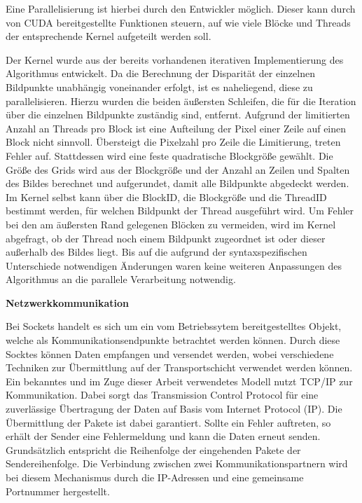 \documentclass[times, 10pt,twocolumn]{article}
\begin{document}
Eine Parallelisierung ist hierbei durch den Entwickler möglich. Dieser kann durch von CUDA bereitgestellte Funktionen steuern, auf wie viele Blöcke und Threads der entsprechende Kernel aufgeteilt werden soll.

Der Kernel wurde aus der bereits vorhandenen iterativen Implementierung des Algorithmus entwickelt. Da die Berechnung der Disparität der einzelnen Bildpunkte unabhängig voneinander erfolgt, ist es naheliegend, diese zu parallelisieren. Hierzu wurden die beiden äußersten Schleifen, die für die Iteration über die einzelnen Bildpunkte zuständig sind, entfernt.  
Aufgrund der limitierten Anzahl an Threads pro Block ist eine Aufteilung der Pixel einer Zeile auf einen Block nicht sinnvoll. Übersteigt die Pixelzahl pro Zeile die Limitierung, treten Fehler auf. Stattdessen wird eine feste quadratische Blockgröße gewählt. Die Größe des Grids wird aus der Blockgröße und der Anzahl an Zeilen und Spalten des Bildes berechnet und aufgerundet, damit alle Bildpunkte abgedeckt werden. Im Kernel selbst kann über die BlockID, die Blockgröße und die ThreadID bestimmt werden, für welchen Bildpunkt der Thread ausgeführt wird. Um Fehler bei den am äußersten Rand gelegenen Blöcken zu vermeiden, wird im Kernel abgefragt, ob der Thread noch einem Bildpunkt zugeordnet ist oder dieser außerhalb des Bildes liegt.
Bis auf die aufgrund der syntaxspezifischen Unterschiede notwendigen Änderungen waren keine weiteren Anpassungen des Algorithmus an die parallele Verarbeitung notwendig.


\textbf{Netzwerkkommunikation}

Bei Sockets handelt es sich um ein vom Betriebssytem bereitgestelltes Objekt, welche als Kommunikationsendpunkte betrachtet werden können. Durch diese Socktes können Daten empfangen und versendet werden, wobei verschiedene Techniken zur Übermittlung auf der Transportschicht verwendet werden können.
Ein bekanntes und im Zuge dieser Arbeit verwendetes Modell nutzt TCP/IP zur Kommunikation. Dabei sorgt das Transmission Control Protocol für eine zuverlässige Übertragung der Daten auf Basis vom Internet Protocol (IP). Die Übermittlung der Pakete ist dabei garantiert. Sollte ein Fehler auftreten, so erhält der Sender eine Fehlermeldung und kann die Daten erneut senden. Grundsätzlich entspricht die Reihenfolge der eingehenden Pakete der Sendereihenfolge.
Die Verbindung zwischen zwei Kommunikationspartnern wird bei diesem Mechanismus durch die IP-Adressen und eine gemeinsame Portnummer hergestellt.
\end{document}
